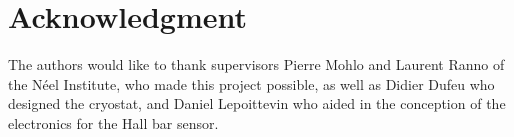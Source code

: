 \documentclass[journal]{IEEEtran}
\begin{document}
\section*{Acknowledgment}


The authors would like to thank supervisors Pierre Mohlo and Laurent Ranno of the Néel Institute, who made this project possible, as well as Didier Dufeu who designed the cryostat, and Daniel Lepoittevin who aided in the conception of the electronics for the Hall bar sensor.


\ifCLASSOPTIONcaptionsoff
  \newpage
\fi










%




% 
\end{document}

